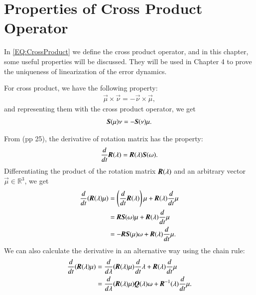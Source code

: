 \chapter{Properties of Cross Product Operator}
In \ref{EQ:CrossProduct} we define the cross product operator, and in this chapter, some useful properties will be discussed. They will be used in Chapter 4 to prove the uniqueness of linearization of the error dynamics.
\begin{identity}
\label{IdentiB1}
For cross product, we have the following property:
\begin{align}
\vec{\mu} \times \vec{\nu}=-\vec{\nu}\times \vec{\mu},
\end{align}
and representing them with the cross product operator, we get
\begin{align}
\emph{\textbf{S}}(\vec{\mu})\vec{\nu}=-\emph{\textbf{S}}(\vec{\nu})\vec{\mu}.
\end{align}
\end{identity}
From \cite{F2011} (pp 25), the derivative of rotation matrix has the property:
\begin{align}
\dfrac{d}{dt}\emph{\textbf{R}}(\vec{\lambda})=\emph{\textbf{R}}(\vec{\lambda})\emph{\textbf{S}}(\vec{\omega}).
\end{align}
Differentiating the product of the rotation matrix $ \emph{\textbf{R}}(\vec{\lambda}) $ and an arbitrary vector $\vec{\mu}\in \mathbb{R}^{3}$, we get
\begin{align}
\dfrac{d}{dt}(\emph{\textbf{R}}(\vec{\lambda})\vec{\mu})
&=\left(\dfrac{d}{dt}\emph{\textbf{R}}(\vec{\lambda})\right)\vec{\mu}+\emph{\textbf{R}}(\vec{\lambda})\dfrac{d}{dt}\vec{\mu} \nonumber \\
&=\emph{\textbf{R}}\emph{\textbf{S}}(\vec{\omega})\vec{\mu}+\emph{\textbf{R}}(\vec{\lambda})\dfrac{d}{dt}\vec{\mu} \nonumber \\
&=-\emph{\textbf{R}}\emph{\textbf{S}}(\vec{\mu})\vec{\omega}+\emph{\textbf{R}}(\vec{\lambda})\dfrac{d}{dt}\vec{\mu}.\label{EQ:DiffProductRotationArbVector1}
\end{align} 
We can also calculate the derivative in an alternative way using the chain rule:
\begin{align}
\dfrac{d}{dt}(\emph{\textbf{R}}(\vec{\lambda})\vec{\mu})
&=\dfrac{d}{d\vec{\lambda}}(\emph{\textbf{R}}(\vec{\lambda})\vec{\mu})\dfrac{d}{dt}\vec{\lambda}+
\emph{\textbf{R}}(\vec{\lambda})\dfrac{d}{dt}\vec{\mu} \nonumber \\
&=\dfrac{d}{d\vec{\lambda}}(\emph{\textbf{R}}(\vec{\lambda})\vec{\mu})\emph{\textbf{Q}}(\vec{\lambda})\vec{\omega}+
\emph{\textbf{R}}^{-1}(\vec{\lambda})\dfrac{d}{dt}\vec{\mu}.\label{EQ:DiffProductRotationArbVector2}
\end{align}
